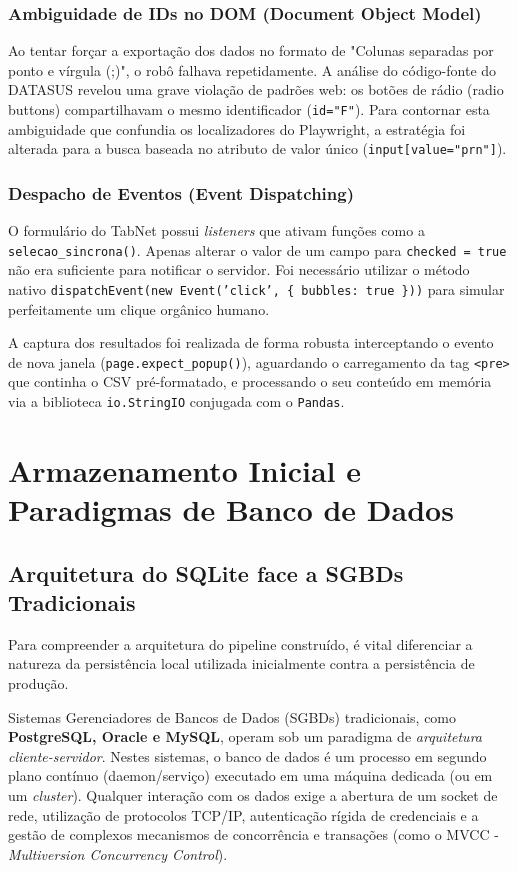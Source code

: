 \documentclass[12pt,a4paper]{report}
\begin{document}
\subsection{Ambiguidade de IDs no DOM (Document Object Model)}
Ao tentar forçar a exportação dos dados no formato de "Colunas separadas por ponto e vírgula (;)", o robô falhava repetidamente. A análise do código-fonte do DATASUS revelou uma grave violação de padrões web: os botões de rádio (radio buttons) compartilhavam o mesmo identificador (\texttt{id="F"}).
Para contornar esta ambiguidade que confundia os localizadores do Playwright, a estratégia foi alterada para a busca baseada no atributo de valor único (\texttt{input[value="prn"]}).

\subsection{Despacho de Eventos (Event Dispatching)}
O formulário do TabNet possui \textit{listeners} que ativam funções como a \texttt{selecao\_sincrona()}. Apenas alterar o valor de um campo para \texttt{checked = true} não era suficiente para notificar o servidor. Foi necessário utilizar o método nativo \texttt{dispatchEvent(new Event('click', \{ bubbles: true \}))} para simular perfeitamente um clique orgânico humano.

A captura dos resultados foi realizada de forma robusta interceptando o evento de nova janela (\texttt{page.expect\_popup()}), aguardando o carregamento da tag \texttt{<pre>} que continha o CSV pré-formatado, e processando o seu conteúdo em memória via a biblioteca \texttt{io.StringIO} conjugada com o \texttt{Pandas}.

\chapter{Armazenamento Inicial e Paradigmas de Banco de Dados}

\section{Arquitetura do SQLite face a SGBDs Tradicionais}
Para compreender a arquitetura do pipeline construído, é vital diferenciar a natureza da persistência local utilizada inicialmente contra a persistência de produção.

Sistemas Gerenciadores de Bancos de Dados (SGBDs) tradicionais, como \textbf{PostgreSQL, Oracle e MySQL}, operam sob um paradigma de \textit{arquitetura cliente-servidor}. Nestes sistemas, o banco de dados é um processo em segundo plano contínuo (daemon/serviço) executado em uma máquina dedicada (ou em um \textit{cluster}). Qualquer interação com os dados exige a abertura de um socket de rede, utilização de protocolos TCP/IP, autenticação rígida de credenciais e a gestão de complexos mecanismos de concorrência e transações (como o MVCC - \textit{Multiversion Concurrency Control}).
\end{document}
